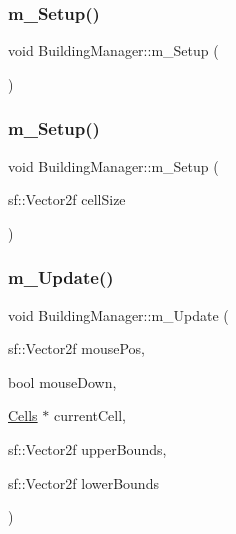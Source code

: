 \mbox{\label{class_building_manager_af7e1e2b4d3dc88c2254d0a040d599b16}} 
\subsubsection{\texorpdfstring{m\+\_\+\+Setup()}{m\_Setup()}\hspace{0.1cm}{\footnotesize\ttfamily [1/2]}}
{\footnotesize\ttfamily void Building\+Manager\+::m\+\_\+\+Setup (\begin{DoxyParamCaption}{ }\end{DoxyParamCaption})}

\mbox{\label{class_building_manager_a53af18d219085b44a5f4267b7b55d2ea}} 
\subsubsection{\texorpdfstring{m\+\_\+\+Setup()}{m\_Setup()}\hspace{0.1cm}{\footnotesize\ttfamily [2/2]}}
{\footnotesize\ttfamily void Building\+Manager\+::m\+\_\+\+Setup (\begin{DoxyParamCaption}\item[{sf\+::\+Vector2f}]{cell\+Size }\end{DoxyParamCaption})}

\mbox{\label{class_building_manager_abedabfdf29d8bef3d49014ac4a37352e}} 
\subsubsection{\texorpdfstring{m\+\_\+\+Update()}{m\_Update()}}
{\footnotesize\ttfamily void Building\+Manager\+::m\+\_\+\+Update (\begin{DoxyParamCaption}\item[{sf\+::\+Vector2f}]{mouse\+Pos,  }\item[{bool}]{mouse\+Down,  }\item[{\mbox{\hyperlink{class_cells}{Cells}} $\ast$}]{current\+Cell,  }\item[{sf\+::\+Vector2f}]{upper\+Bounds,  }\item[{sf\+::\+Vector2f}]{lower\+Bounds }\end{DoxyParamCaption})}



